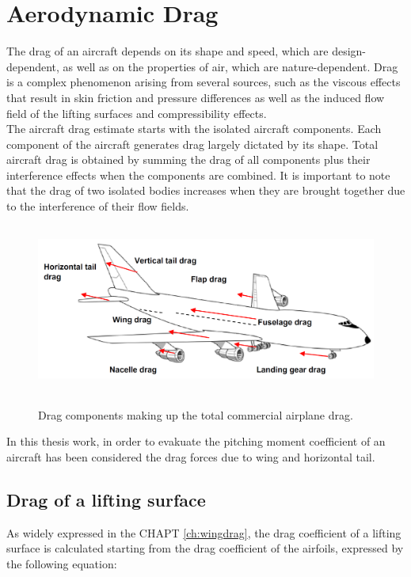 \section{Aerodynamic Drag}
The drag of an aircraft depends on its shape and speed, which are design-dependent, as well as on the properties of air, which are nature-dependent. Drag is a complex phenomenon arising from several sources, such as the viscous effects that result in skin friction and pressure differences as well as the induced flow field of the lifting surfaces and compressibility effects. \\
The aircraft drag estimate starts with the isolated aircraft components. Each component of the aircraft generates drag largely dictated by its shape. Total aircraft drag is obtained by summing the drag of all components plus their interference effects when the components are combined. It is important to note that the drag of two isolated bodies increases when they are brought together due to the interference of their flow fields.\cite{kundu}

\begin{figure}[H]
\centering
{\includegraphics[height=5.6cm]{Immagini/dragcomponent.png}} 
\label{drag}
\caption{Drag components making up the total commercial airplane drag.\cite{sforza2014commercial}}
\end{figure} 		

In this thesis work, in order to evakuate the pitching moment coefficient of an aircraft has been considered the drag forces due to wing and horizontal tail.

\subsection{Drag of a lifting surface}

As widely expressed in the CHAPT  \ref{ch:wingdrag}, the drag coefficient of a lifting surface is calculated starting from the drag coefficient of the airfoils, expressed by the following equation:

